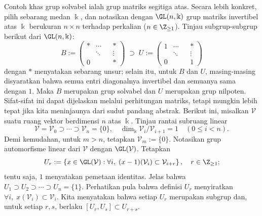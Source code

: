 \begin{example}
	Contoh khas grup solvabel ialah grup matriks segitiga atas. Secara lebih konkret, pilih sebarang medan $\Bbbk$, dan notasikan dengan $\GL(n,\Bbbk)$ grup matriks invertibel atas $\Bbbk$ berukuran $n \times n$ terhadap perkalian ($n \in \Z_{\geq 1}$). Tinjau subgrup-subgrup berikut dari $\GL(n, \Bbbk)$:
	\[
		B := \begin{pmatrix}
		* & \cdots & & * \\
		& \ddots & & \vdots \\
		0 & & & *
	\end{pmatrix} \; \supset \;
		U := \begin{pmatrix}
		1 & \cdots & & * \\
		& \ddots & & \vdots \\
		0 & & & 1
	\end{pmatrix} \]
	dengan $*$ menyatakan sebarang unsur; selain itu, untuk $B$ dan $U$, masing-masing disyaratkan bahwa semua entri diagonalnya invertibel dan semuanya sama dengan $1$. Maka $B$ merupakan grup solvabel dan $U$ merupakan grup nilpoten. Sifat-sifat ini dapat dijelaskan melalui perhitungan matriks, tetapi mungkin lebih tepat jika kita meninjaunya dari sudut pandang abstrak. Berikut ini, misalkan $\mathcal{V}$ suatu ruang vektor berdimensi $n$ atas $\Bbbk$. Tinjau rantai subruang linear
	\[ \mathcal{V} = \mathcal{V}_0 \supset \cdots \supset \mathcal{V}_n = \{0\}, \quad \dim_\Bbbk \mathcal{V}_i/\mathcal{V}_{i+1} = 1 \quad (0 \leq i < n). \]
	Demi kemudahan, untuk $m > n$, tetapkan $\mathcal{V}_m := \{0\}$. Notasikan grup automorfisme linear dari $\mathcal{V}$ dengan $\GL(\mathcal{V})$. Tetapkan
	\begin{equation*}
		U_r := \left\{ x \in \GL(\mathcal{V}) : \forall i, \; (x - 1)(\mathcal{V}_i) \subset \mathcal{V}_{i+r} \right\}, \quad r \in \Z_{\geq 1};
	\end{equation*}
	tentu saja, $1$ menyatakan pemetaan identitas. Jelas bahwa $U_1 \supset U_2 \supset \cdots \supset U_n = \{1\}$. Perhatikan pula bahwa definisi $U_r$ menyiratkan $\forall i, \; x(\mathcal{V}_i) \subset \mathcal{V}_i$. Kita menyatakan bahwa setiap $U_r$ merupakan subgrup dan, untuk setiap $r,s$, berlaku $[U_r, U_s] \subset U_{r+s}$.


\end{example}

